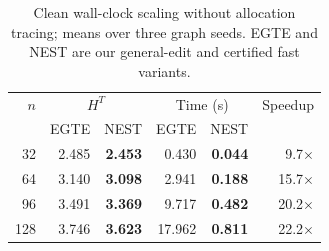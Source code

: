 \begin{table}[t]
\centering\small
\caption{Clean wall-clock scaling without allocation tracing; means over three graph seeds. EGTE and NEST are our general-edit and certified fast variants.}
\label{tab:scaling}
\begin{tabular}{rrrrrr}
\toprule
$n$ & \multicolumn{2}{c}{$H^T$} & \multicolumn{2}{c}{Time (s)} & Speedup \\
 & EGTE & NEST & EGTE & NEST & \\
\midrule
32 & 2.485 & \textbf{2.453} & 0.430 & \textbf{0.044} & 9.7$\times$ \\
64 & 3.140 & \textbf{3.098} & 2.941 & \textbf{0.188} & 15.7$\times$ \\
96 & 3.491 & \textbf{3.369} & 9.717 & \textbf{0.482} & 20.2$\times$ \\
128 & 3.746 & \textbf{3.623} & 17.962 & \textbf{0.811} & 22.2$\times$ \\
\bottomrule
\end{tabular}
\end{table}
